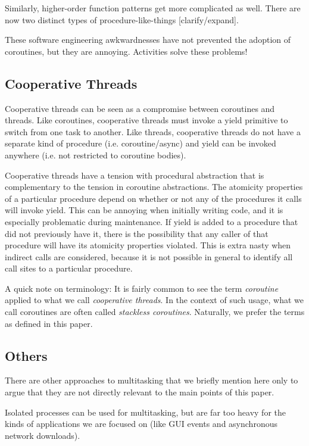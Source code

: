 \documentclass[10pt,preprint]{sigplanconf}
\begin{document}
Similarly, higher-order function patterns get more complicated as well.
There are now two distinct types of procedure-like-things [clarify/expand].

These software engineering awkwardnesses have not prevented the adoption of coroutines, but they are annoying.
Activities solve these problems!

\subsection{Cooperative Threads}

Cooperative threads can be seen as a compromise between coroutines and threads.
Like coroutines, cooperative threads must invoke a yield primitive to switch from one task to another.
Like threads, cooperative threads do not have a separate kind of procedure (i.e. coroutine/async) and yield can be invoked anywhere (i.e. not restricted to coroutine bodies).

Cooperative threads have a tension with procedural abstraction that is complementary to the tension in coroutine abstractions.
The atomicity properties of a particular procedure depend on whether or not any of the procedures it calls will invoke yield.
This can be annoying when initially writing code, and it is especially problematic during maintenance.
If yield is added to a procedure that did not previously have it, there is the possibility that any caller of that procedure will have its atomicity properties violated.
This is extra nasty when indirect calls are considered, because it is not possible in general to identify all call sites to a particular procedure.

A quick note on terminology: It is fairly common to see the term \emph{coroutine} applied to what we call \emph{cooperative threads}.
In the context of such usage, what we call coroutines are often called \emph{stackless coroutines}.
Naturally, we prefer the terms as defined in this paper.

\subsection{Others}

There are other approaches to multitasking that we briefly mention here only to argue that they are not directly relevant to the main points of this paper.

Isolated processes can be used for multitasking, but are far too heavy for the kinds of applications we are focused on (like GUI events and asynchronous network downloads).
\end{document}
